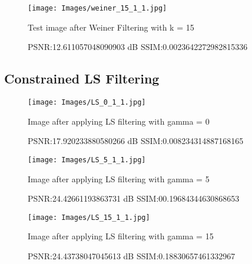 \documentclass{article}
\begin{document}
\begin{figure}[!htbp]

\begin{minipage}[!b]{1.0\linewidth}
  \centering
  \centerline{\texttt{[image: Images/weiner\_15\_1\_1.jpg]}}
  \centerline{Test image after Weiner Filtering with k = 15}\medskip
   PSNR:12.611057048090903 dB
  SSIM:0.0023642272982815336
\end{minipage}
%
\end{figure}



\subsection[!htbp]{Constrained LS Filtering}

\begin{figure}[!htbp]

\begin{minipage}[!b]{1.0\linewidth}
  \centering
  \centerline{\texttt{[image: Images/LS\_0\_1\_1.jpg]}}
  \centerline{Image after applying LS filtering with gamma = 0}\medskip
  PSNR:17.920233880580266 dB
  SSIM:0.008234314887168165
\end{minipage}
%
\end{figure}

\begin{figure}[!htbp]

\begin{minipage}[!b]{1.0\linewidth}
  \centering
  \centerline{\texttt{[image: Images/LS\_5\_1\_1.jpg]}}
  \centerline{Image after applying LS filtering with gamma = 5}\medskip
  PSNR:24.42661193863731 dB
  SSIM:00.19684344630868653
\end{minipage}
%
\end{figure}

\begin{figure}[!htbp]

\begin{minipage}[!b]{1.0\linewidth}
  \centering
  \centerline{\texttt{[image: Images/LS\_15\_1\_1.jpg]}}
  \centerline{Image after applying LS filtering with gamma = 15}\medskip
  PSNR:24.43738047045613 dB
  SSIM:0.18830657461332967
\end{minipage}
%
\end{figure}
\end{document}
